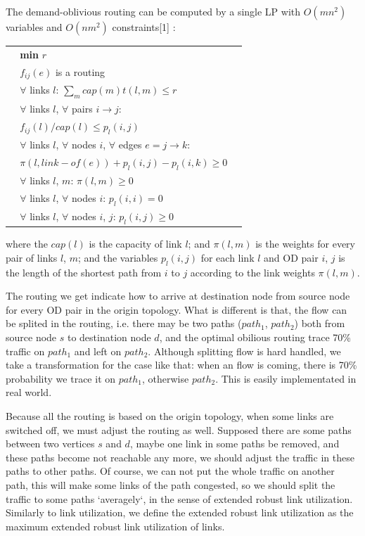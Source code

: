 \documentclass[conference]{IEEEtran}
\begin{document}
The demand-oblivious routing can be computed by a single LP with $O(mn^2)$ variables and $O(nm^2)$ constraints[1] :
\begin{table}[!th]
\begin{tabular}{ll}
$\:\:$\quad\quad\quad\quad\ \textbf{min} $r$ \\
$\:\:$\quad\quad\quad\quad\ $f_{ij}(e)$ is a routing \\
$\:\:$\quad\quad\quad\quad\ $\forall$ links $l$: $\sum_m cap(m)t(l,m) \le r$ \\
$\:\:$\quad\quad\quad\quad\ $\forall$ links $l$, $\forall$ pairs $i \rightarrow j$: \\
$\:\:$\quad\quad\quad\quad\quad\quad\ $f_{ij}(l)/cap(l) \le p_l(i,j)$ \\ 
$\:\:$\quad\quad\quad\quad\ $\forall$ links $l$, $\forall$ nodes $i$, $\forall$ edges $e = j \rightarrow k$: \\
$\:\:$\quad\quad\quad\quad\quad\quad\ $\pi(l, link-of(e)) + p_l(i,j) - p_l(i,k) \ge 0$ \\
$\:\:$\quad\quad\quad\quad\ $\forall$ links $l$, $m$: $\pi(l, m) \ge 0$ \\
$\:\:$\quad\quad\quad\quad\ $\forall$ links $l$, $\forall$ nodes $i$: $p_l(i,i) = 0$ \\
$\:\:$\quad\quad\quad\quad\ $\forall$ links $l$, $\forall$ nodes $i$, $j$: $p_l(i,j) \ge 0$ \\
\end{tabular}
\end{table}


where the $cap(l)$ is the capacity of link $l$; 
and $\pi(l,m)$ is the weights for every pair of links $l$, $m$; and the variables $p_l(i,j)$ for each link $l$ 
and OD pair $i$, $j$ is the length of the shortest path from $i$ to $j$ according to the link weights $\pi(l, m)$.


The routing we get indicate how to arrive at destination node from source node for every OD pair in the origin topology.
What is different is that, the flow can be splited in the routing, i.e. there may be two paths ($path_1$, $path_2$)
both from source node $s$ to destination node $d$, and the optimal obilious routing trace 70\% traffic on 
$path_1$ and left on $path_2$. Although splitting flow is hard handled, we take a transformation for the case like that:
when an flow is coming, there is 70\% probability we trace it on $path_1$, otherwise $path_2$. This is easily implementated 
in real world.


Because all the routing is based on the origin topology, when some links are switched off, we must adjust the routing 
as well. Supposed there are some paths between two vertices $s$ and $d$, maybe one link in some paths be removed, 
and these paths become not reachable any more, we should adjust the traffic in these paths to other paths. Of course,
we can not put the whole traffic on another path, this will make some links of the path congested, so we should split the traffic 
to some paths `averagely`, in the sense of extended robust link utilization. Similarly to link utilization, we define the extended
robust link utilization as the maximum extended robust link utilization of links.
\end{document}
